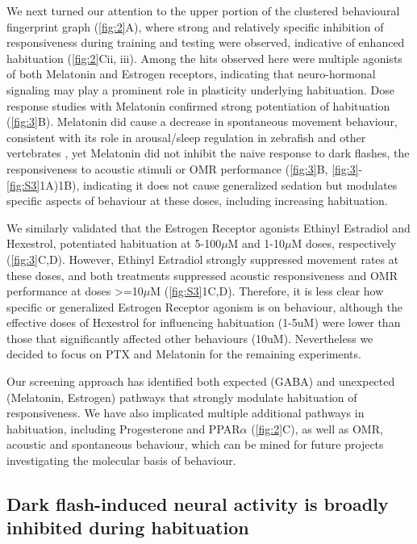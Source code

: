 \documentclass[9pt,lineno]{RandlettLab_elife}
\begin{document}
We next turned our attention to the upper portion of the clustered behavioural fingerprint graph (\autoref{fig:2}A), where strong and relatively specific inhibition of responsiveness during training and testing were observed, indicative of enhanced habituation (\autoref{fig:2}Cii, iii). Among the hits observed here were multiple agonists of both Melatonin and Estrogen receptors, indicating that neuro-hormonal signaling may play a prominent role in plasticity underlying habituation. Dose response studies with Melatonin confirmed strong potentiation of habituation (\autoref{fig:3}B). Melatonin did cause a decrease in spontaneous movement behaviour, consistent with its role in arousal/sleep regulation in zebrafish and other vertebrates \cite{Gandhi2015-vw, Zhdanova2001-dq}, yet Melatonin did not inhibit the naive response to dark flashes, the responsiveness to acoustic stimuli or OMR performance (\autoref{fig:3}B, \autoref{fig:3}-\autoref{fig:S3}1A)1B), indicating it does not cause generalized sedation but modulates specific aspects of behaviour at these doses, including increasing habituation. 

We similarly validated that the Estrogen Receptor agonists Ethinyl Estradiol and Hexestrol, potentiated habituation at 5-100$\mu$M and 1-10$\mu$M doses, respectively (\autoref{fig:3}C,D). However, Ethinyl Estradiol strongly suppressed movement rates at these doses, and both treatments suppressed acoustic responsiveness and OMR performance at doses >=10$\mu$M (\autoref{fig:S3}1C,D). Therefore, it is less clear how specific or generalized Estrogen Receptor agonism is on behaviour, although the effective doses of Hexestrol for influencing habituation (1-5uM) were lower than those that significantly affected other behaviours (10uM). Nevertheless we decided to focus on PTX and Melatonin for the remaining experiments. 


Our screening approach has identified both expected (GABA) and unexpected (Melatonin, Estrogen) pathways that strongly modulate habituation of responsiveness. We have also implicated multiple additional pathways in habituation, including Progesterone and PPAR$\alpha$ (\autoref{fig:2}C), as well as OMR, acoustic and spontaneous behaviour, which can be mined for future projects investigating the molecular basis of behaviour. 

\subsection{Dark flash-induced neural activity is broadly inhibited during habituation}
\end{document}
